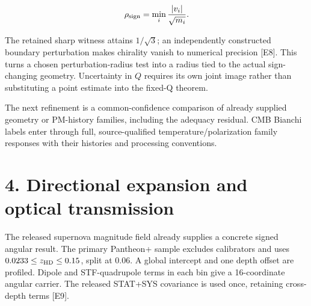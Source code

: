 \documentclass[
  10pt,
]{article}
\begin{document}
\[
\rho_{\rm sign}=\min_i\frac{|v_i|}{\sqrt{m_i}}.
\]

The retained sharp witness attains \(1/\sqrt3\); an independently
constructed boundary perturbation makes chirality vanish to numerical
precision {[}E8{]}. This turns a chosen perturbation-radius test into a
radius tied to the actual sign-changing geometry. Uncertainty in \(Q\)
requires its own joint image rather than substituting a point estimate
into the fixed-Q theorem.

The next refinement is a common-confidence comparison of already
supplied geometry or PM-history families, including the adequacy
residual. CMB Bianchi labels enter through full, source-qualified
temperature/polarization family responses with their histories and
processing conventions.

\hypertarget{directional-expansion-and-optical-transmission}{%
\section{4. Directional expansion and optical
transmission}\label{directional-expansion-and-optical-transmission}}

The released supernova magnitude field already supplies a concrete
signed angular result. The primary Pantheon+ sample excludes calibrators
and uses \(0.0233\le z_{\rm HD}\le0.15\), split at 0.06. A global
intercept and one depth offset are profiled. Dipole and STF-quadrupole
terms in each bin give a 16-coordinate angular carrier. The released
STAT+SYS covariance is used once, retaining cross-depth terms {[}E9{]}.
\end{document}
